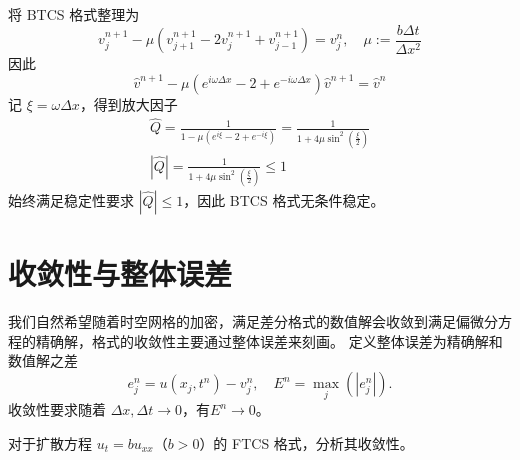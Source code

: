 \begin{solution*}
    将 BTCS 格式整理为
    \[
        v_j^{n+1} - \mu \left( v_{j+1}^{n+1} - 2 v_j^{n+1} + v_{j-1}^{n+1} \right) = v_j^n, \quad \mu := \frac{b \Delta t}{\Delta x^2}
    \]
    因此
    \[
        \hat{v}^{n+1} - \mu (e^{i \omega \Delta x} - 2 + e^{- i \omega \Delta x}) \hat{v}^{n+1} = \hat{v}^n
    \]
    记 $\xi = \omega \Delta x$，得到放大因子
    \begin{gather*}
        \widehat{Q} ={} \frac{1}{1 - \mu (e^{i \xi} - 2 + e^{- i \xi})} =  \frac{1}{1 + 4 \mu \sin^2(\frac{\xi}2)} \\
        |\widehat{Q}| ={} \frac{1}{1 + 4 \mu \sin^2(\frac{\xi}2)} \le 1
    \end{gather*}
    始终满足稳定性要求 $|\widehat{Q}| \le 1$，因此 BTCS 格式无条件稳定。
\end{solution*}


\section{收敛性与整体误差}

我们自然希望随着时空网格的加密，满足差分格式的数值解会收敛到满足偏微分方程的精确解，格式的收敛性主要通过整体误差来刻画。
定义整体误差为精确解和数值解之差
\[
    e_j^n = u(x_j,t^n) - v_j^n,\quad E^n = \max_j(|e_j^n|).
\]
收敛性要求随着 $\Delta x,\Delta t \to 0$，有$E^n \to 0$。

\begin{example}
    对于扩散方程 $u_t = b u_{xx}$（$b>0$）的 FTCS 格式，分析其收敛性。
\end{example}

